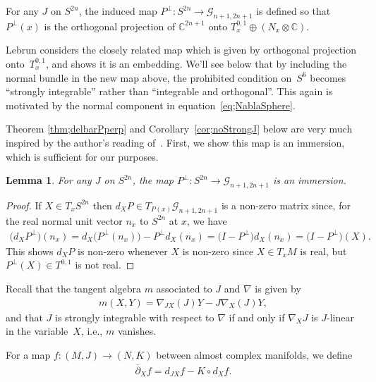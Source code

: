 \documentclass[11pt]{article}
\newtheorem{lem}[thm]{Lemma}
\numberwithin{equation}{section}
\newcommand{\CC}{\mathbb{C}}
\newcommand{\cG}{{\mathcal G}}
\begin{document}
\begin{defn}For any $J$ on $S^{2n}$, the induced map $P^\perp\colon S^{2n} \to \cG_{n+1,2n+1}$ is defined so that~$P^\perp(x)$ is the orthogonal projection of $\CC^{2n+1}$ onto $T^{0,1}_x \oplus (N_x \otimes \CC)$.
\end{defn}

Lebrun \cite{L} considers the closely related map which is given by orthogonal projection onto~$T^{0,1}_x$, and shows it is an embedding. We'll see below that by including the normal bundle in the new map above, the prohibited condition on~$S^6$ becomes ``strongly integrable'' rather than ``integrable and orthogonal''. This again is motivated by the normal component in equation~\eqref{eq;NablaSphere}.

Theorem \ref{thm;delbarPperp} and Corollary~\ref{cor;noStrongJ} below are very much inspired by the author's reading of~\cite{L}. First, we show this map is an immersion, which is sufficient for our purposes.

\begin{lem} For any $J$ on $S^{2n}$, the map $P^\perp\colon S^{2n} \to \cG_{n+1,2n+1}$ is an immersion.
\end{lem}

\begin{proof}If $X \in T_x S^{2n}$ then $d_X P \in T_{P(x)} \cG_{n+1,2n+1}$ is a non-zero matrix since, for the real normal unit vector $n_x$ to $S^{2n}$ at $x$, we have
\begin{gather*}
\big(d_XP^\perp\big)(n_x) = d_X\big(P^\perp(n_x)\big) - P^\perp d_X(n_x) = \big(I-P^\perp \big) d_X(n_x) = \big(I-P^\perp\big)(X).
\end{gather*}
This shows $d_X P$ is non-zero whenever $X$ is non-zero since $X \in T_xM$ is real, but $P^\perp(X) \in T^{0,1}$ is not real.
\end{proof}

Recall that the tangent algebra $m$ associated to $J$ and $\nabla$ is given by
\begin{gather*}
m(X,Y) = \nabla_{JX} (J)Y - J \nabla_X (J) Y,
\end{gather*}
and that $J $ is strongly integrable with respect to $\nabla$ if and only if $\nabla_X J$ is $J$-linear in the variable~$X$, i.e., $m$ vanishes.

For a map $f\colon (M,J) \to (N,K) $ between almost complex manifolds, we define
\begin{gather*}
\overline{\partial}_X f = d_{JX} f - K \circ d_X f.
\end{gather*}
\end{document}
